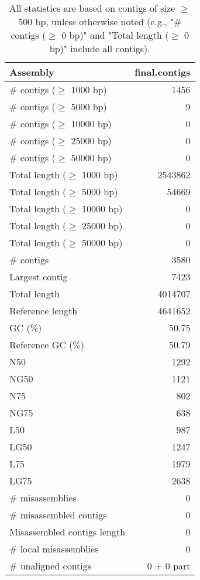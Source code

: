 \documentclass[12pt,a4paper]{article}
\begin{document}
\begin{table}[ht]
\begin{center}
\caption{All statistics are based on contigs of size $\geq$ 500 bp, unless otherwise noted (e.g., "\# contigs ($\geq$ 0 bp)" and "Total length ($\geq$ 0 bp)" include all contigs).}
\begin{tabular}{|l*{1}{|r}|}
\hline
Assembly & final.contigs \\ \hline
\# contigs ($\geq$ 1000 bp) & 1456 \\ \hline
\# contigs ($\geq$ 5000 bp) & 9 \\ \hline
\# contigs ($\geq$ 10000 bp) & 0 \\ \hline
\# contigs ($\geq$ 25000 bp) & 0 \\ \hline
\# contigs ($\geq$ 50000 bp) & 0 \\ \hline
Total length ($\geq$ 1000 bp) & 2543862 \\ \hline
Total length ($\geq$ 5000 bp) & 54669 \\ \hline
Total length ($\geq$ 10000 bp) & 0 \\ \hline
Total length ($\geq$ 25000 bp) & 0 \\ \hline
Total length ($\geq$ 50000 bp) & 0 \\ \hline
\# contigs & 3580 \\ \hline
Largest contig & 7423 \\ \hline
Total length & 4014707 \\ \hline
Reference length & 4641652 \\ \hline
GC (\%) & 50.75 \\ \hline
Reference GC (\%) & 50.79 \\ \hline
N50 & 1292 \\ \hline
NG50 & 1121 \\ \hline
N75 & 802 \\ \hline
NG75 & 638 \\ \hline
L50 & 987 \\ \hline
LG50 & 1247 \\ \hline
L75 & 1979 \\ \hline
LG75 & 2638 \\ \hline
\# misassemblies & 0 \\ \hline
\# misassembled contigs & 0 \\ \hline
Misassembled contigs length & 0 \\ \hline
\# local misassemblies & 0 \\ \hline
\# unaligned contigs & 0 + 0 part \\ \hline

\end{tabular}
\end{center}
\end{table}
\end{document}
